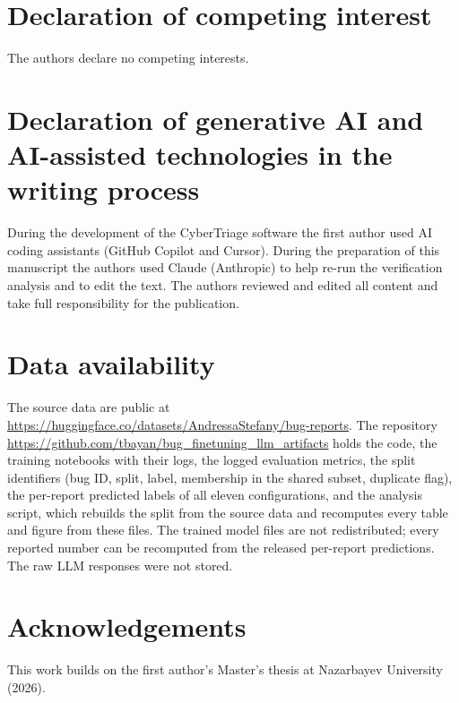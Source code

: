 \documentclass[a4paper,fleqn]{cas-sc}
\newcommand{\coderepo}{\url{https://github.com/tbayan/bug_finetuning_llm_artifacts}}
\begin{document}
\section*{Declaration of competing interest}
The authors declare no competing interests.

\section*{Declaration of generative AI and AI-assisted technologies in the writing process}
During the development of the CyberTriage software the first author used AI coding
assistants (GitHub Copilot and Cursor). During the preparation of this manuscript the
authors used Claude (Anthropic) to help re-run the verification analysis and to edit the
text. The authors reviewed and edited all content and take full responsibility for the
publication.

\section*{Data availability}
The source data are public at
\url{https://huggingface.co/datasets/AndressaStefany/bug-reports}. The repository
\coderepo{} holds the code, the training notebooks
with their logs, the logged evaluation metrics, the split identifiers (bug ID, split,
label, membership in the shared subset, duplicate flag), the per-report predicted labels
of all eleven configurations, and the analysis script, which rebuilds the split from the
source data and recomputes every table and figure from these files. The trained model
files are not redistributed; every reported number can be recomputed from the released
per-report predictions. The raw LLM responses were not stored.

\section*{Acknowledgements}
This work builds on the first author's Master's thesis at Nazarbayev University (2026).



\end{document}
